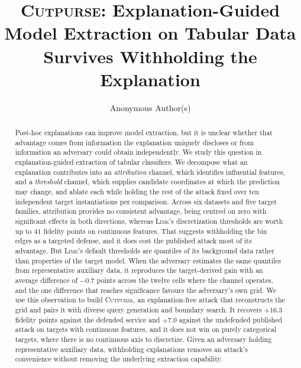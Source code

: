 \documentclass[sigconf,anonymous,review]{acmart}
\newcommand{\sys}{\textsc{Cutpurse}}
\begin{document}
\title[\sys]{\sys: Explanation-Guided Model Extraction on Tabular Data
Survives Withholding the Explanation}

\author{Anonymous Author(s)}
\email{}
\renewcommand{\shortauthors}{Anonymous}

\begin{abstract}
Post-hoc explanations can improve model extraction, but it is unclear whether that advantage comes
from information the explanation uniquely discloses or from information an adversary could obtain
independently. We study this question in explanation-guided extraction of tabular classifiers. We
decompose what an explanation contributes into an \emph{attribution} channel, which identifies
influential features, and a \emph{threshold} channel, which supplies candidate coordinates at which
the prediction may change, and ablate each while holding the rest of the attack fixed over ten
independent target instantiations per comparison. Across six datasets and five target families,
attribution provides no consistent advantage, being centred on zero with significant effects in both
directions, whereas \textsc{Lime}'s discretization thresholds are worth up to $41$ fidelity points on
continuous features. That suggests withholding the bin edges as a targeted defense, and it does cost
the published attack most of its advantage. But \textsc{Lime}'s default thresholds are quantiles of
its background data rather than properties of the target model. When the adversary estimates the same
quantiles from representative auxiliary data, it reproduces the target-derived gain with an average
difference of $-0.7$ points across the twelve cells where the channel operates, and the one
difference that reaches significance favours the adversary's own grid. We
use this observation to build \sys, an explanation-free attack that reconstructs the grid and pairs
it with diverse query generation and boundary search. It recovers $+16.3$ fidelity points against the
defended service and $+7.0$ against the undefended published attack on targets with continuous
features, and it does not win on purely categorical targets, where there is no continuous axis to
discretize. Given an adversary holding representative auxiliary data, withholding explanations
removes an attack's convenience without removing the underlying extraction capability.
\end{abstract}
\end{document}
